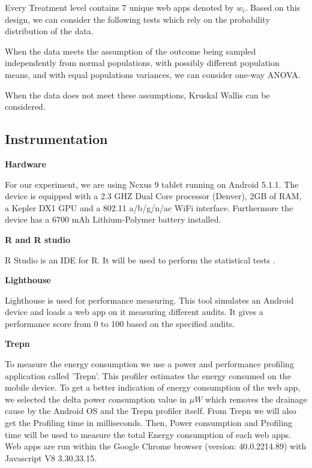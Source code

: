 Every Treatment level contains 7 unique web apps denoted by $w_i$. Based on this design, we can consider the following tests which rely on the probability distribution of the data.


When the data meets the assumption of the outcome being sampled independently from normal populations, with possibly different population means, and with equal populations variances, we can consider one-way ANOVA. 

When the data does not meet these assumptions, Kruskal Wallis can be considered. \newline

	
\subsection{Instrumentation}

\textbf{Hardware}

For our experiment, we are using Nexus 9 tablet running on Android 5.1.1. The device is equipped with a 2.3 GHZ Dual Core processor (Denver), 2GB of RAM, a Kepler DX1 GPU and a 802.11 a/b/g/n/ac WiFi interface. Furthermore the device has a 6700 mAh Lithium-Polymer battery installed. \newline

\textbf{R and R studio}

R Studio is an IDE for R. It will be used to perform the statistical tests \cite{WEBSITE:14}. \newline

\textbf{Lighthouse}

Lighthouse is used for performance measuring. This tool simulates an Android device and loads a web app on it measuring different audits. It gives a performance score from 0 to 100 based on the specified audits.
 \newline

\textbf{Trepn}

To measure the energy consumption we use a power and performance profiling application called 'Trepn'. This profiler estimates the energy consumed on the mobile device. To get a better indication of energy consumption of the web app, we selected the delta power consumption value in $\mu W$ which removes the drainage cause by the Android OS and the Trepn profiler itself. From Trepn we will also get the Profiling time in milliseconds. Then, Power consumption and Profiling time will be used to measure the total Energy consumption of each web apps. Web apps are run within the Google Chrome browser (version: 40.0.2214.89) with Javascript V8 3.30.33.15. \newline

